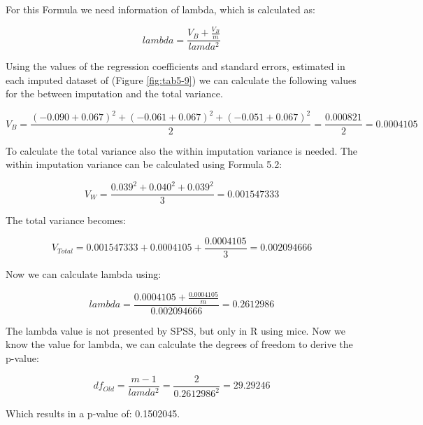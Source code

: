 \documentclass[]{book}
\begin{document}
For this Formula we need information of lambda, which is calculated as:

\[lambda = \frac{V_B + \frac{V_B}{m}}{lamda^2}\]

Using the values of the regression coefficients and standard errors,
estimated in each imputed dataset of (Figure \ref{fig:tab5-9}) we can
calculate the following values for the between imputation and the total
variance.

\[V_B= \frac{(-0.090+0.067)^2 + (-0.061+0.067)^2 +(-0.051+0.067)^2}{2}=\frac{0.000821}{2}=0.0004105\]

To calculate the total variance also the within imputation variance is
needed. The within imputation variance can be calculated using Formula
5.2:

\[V_W= \frac{0.039^2 + 0.040^2 + 0.039^2}{3}=0.001547333\]

The total variance becomes:

\[V_{Total} = 0.001547333+0.0004105+ \frac{0.0004105}{3}=0.002094666\]

Now we can calculate lambda using:

\[lambda = \frac{0.0004105 + \frac{0.0004105}{m}}{0.002094666}=0.2612986\]

The lambda value is not presented by SPSS, but only in R using mice. Now
we know the value for lambda, we can calculate the degrees of freedom to
derive the p-value:

\[df_{Old} = \frac{m-1}{lamda^2}=\frac{2}{0.2612986^2}=29.29246\]

Which results in a p-value of: 0.1502045.


\end{document}
